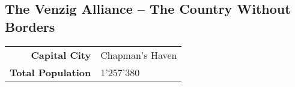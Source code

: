 \subsection{The Venzig Alliance -- The Country Without Borders}
\begin{tabular}{r | l}
    \textbf{Capital City} & Chapman's Haven\\
    \textbf{Total Population} & 1'257'380
\end{tabular}